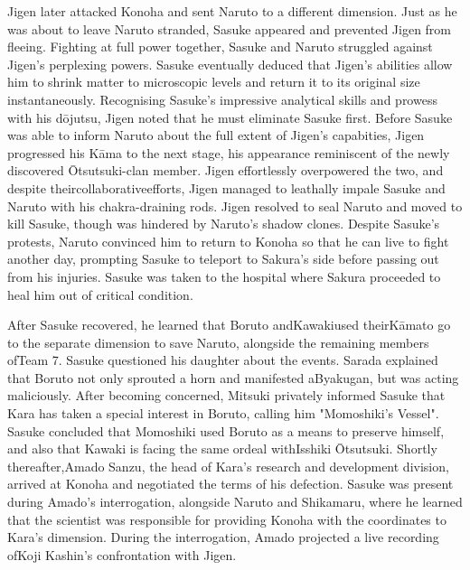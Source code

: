 \documentclass[a4paper,12pt]{article}
\begin{document}
Jigen later attacked Konoha and sent Naruto to a different dimension. Just as he was about to leave Naruto stranded, Sasuke appeared and prevented Jigen from fleeing. Fighting at full power together, Sasuke and Naruto struggled against Jigen's perplexing powers. Sasuke eventually deduced that Jigen's abilities allow him to shrink matter to microscopic levels and return it to its original size instantaneously. Recognising Sasuke's impressive analytical skills and prowess with his dōjutsu, Jigen noted that he must eliminate Sasuke first. Before Sasuke was able to inform Naruto about the full extent of Jigen's capabities,  Jigen progressed his Kāma to the next stage, his appearance reminiscent of the newly discovered Ōtsutsuki-clan member. Jigen effortlessly overpowered the two, and despite theircollaborativeefforts, Jigen managed to leathally impale Sasuke and Naruto with his chakra-draining rods. Jigen resolved to seal Naruto and moved to kill Sasuke, though was hindered by Naruto's shadow clones. Despite Sasuke's protests, Naruto convinced him to return to Konoha so that he can live to fight another day, prompting Sasuke to teleport to Sakura's side before passing out from his injuries. Sasuke was taken to the hospital where Sakura proceeded to heal him out of critical condition.\\ \par \vspace{0.5cm}

After Sasuke recovered, he learned that Boruto andKawakiused theirKāmato go to the separate dimension to save Naruto, alongside the remaining members ofTeam 7. Sasuke questioned his daughter about the events. Sarada explained that Boruto not only sprouted a horn and manifested aByakugan, but was acting maliciously. After becoming concerned, Mitsuki privately informed Sasuke that Kara has taken a special interest in Boruto, calling him "Momoshiki's Vessel". Sasuke concluded that Momoshiki used Boruto as a means to preserve himself, and also that Kawaki is facing the same ordeal withIsshiki Ōtsutsuki. Shortly thereafter,Amado Sanzu, the head of Kara's research and development division, arrived at Konoha and negotiated the terms of his defection. Sasuke was present during Amado's interrogation, alongside Naruto and Shikamaru, where he learned that the scientist was responsible for providing Konoha with the coordinates to Kara's dimension. During the interrogation, Amado projected a live recording ofKoji Kashin's confrontation with Jigen.\\ \par \vspace{0.5cm}
\end{document}
